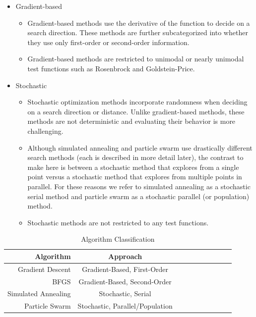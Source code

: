 \documentclass{vgtc}                          %
\begin{document}
\begin{itemize}
\item Gradient-based
	\begin{itemize}
    	\item Gradient-based methods use the derivative of the function to decide on a search direction.  These methods are further subcategorized into whether they use only first-order or second-order information.
    	\item Gradient-based methods are restricted to unimodal or nearly unimodal test functions such as Rosenbrock and Goldstein-Price.
	\end{itemize}
\item Stochastic
	\begin{itemize}
    	\item Stochastic optimization methods incorporate randomness when deciding on a search direction or distance.  Unlike gradient-based methods, these methods are not deterministic and evaluating their behavior is more challenging.
    	\item Although simulated annealing and particle swarm use drastically different search methods (each is described in more detail later), the contrast to make here is between a stochastic method that explores from a single point versus a stochastic method that explores from multiple points in parallel. For these reasons we refer to simulated annealing as a stochastic serial method and particle swarm as a stochastic parallel (or population) method.
    	\item Stochastic methods are not restricted to any test functions.
	\end{itemize}
\end{itemize}

\begin{table}[tb]
	\caption{Algorithm Classification}
    \label{tab:algo_class}
	\scriptsize
	\centering
	\begin{tabu}{
	  r
	  *{7}{c}
	  *{2}{r}
	}
  	\toprule
        Algorithm & Approach \\
	\midrule
        Gradient Descent & Gradient-Based, First-Order \\
        BFGS & Gradient-Based, Second-Order \\
        Simulated Annealing & Stochastic, Serial \\
        Particle Swarm & Stochastic, Parallel/Population \\
	\bottomrule
 	\end{tabu}
\end{table}
\end{document}
